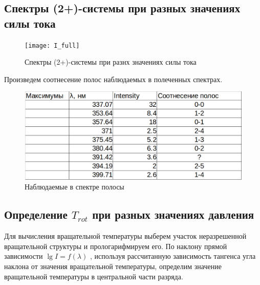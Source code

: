 \documentclass[a4paper,12pt]{article}
\begin{document}
\newpage

	\subsection{Спектры (2+)-системы при разных значениях силы тока}
		\begin{figure}[H]
		\begin{center}
			\texttt{[image: I\_full]}
			\caption{Спектры (2+)-системы при разнх значениях силы тока}
		\end{center}
	\end{figure}
	
\newpage
Произведем соотнесение полос наблюдаемых в полеченных спектрах.

	\begin{figure}[H]
		\begin{center}
			\includegraphics[scale=0.4]{polosi}
			\caption{Наблюдаемые в спектре полосы}
		\end{center}
	\end{figure}
	
\newpage
	\subsection{Определение $T_{rot}$ при разных значениях давления}
	Для вычисления вращательной температуры выберем участок неразрешенной
вращательной структуры и прологарифмируем его. По наклону прямой зависимости $\lg I=f(\lambda)$ , используя рассчитанную
зависимость тангенса угла наклона от значения вращательной температуры, определим значение вращательной температуры в центральной части
разряда.
\end{document}
